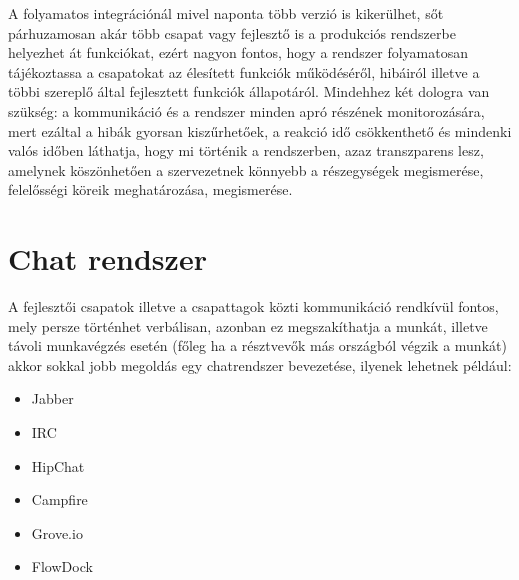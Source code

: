 A folyamatos integrációnál mivel naponta több verzió is kikerülhet, sőt párhuzamosan akár több csapat vagy fejlesztő is a produkciós rendszerbe helyezhet át funkciókat, ezért nagyon fontos, hogy a rendszer folyamatosan tájékoztassa a csapatokat az élesített funkciók működéséről, hibáiról illetve a többi szereplő által fejlesztett funkciók állapotáról. Mindehhez két dologra van szükség: a kommunikáció és a rendszer minden apró részének monitorozására, mert ezáltal a hibák gyorsan kiszűrhetőek, a reakció idő csökkenthető és mindenki valós időben láthatja, hogy mi történik a rendszerben, azaz transzparens lesz, amelynek köszönhetően a szervezetnek könnyebb a részegységek megismerése, felelősségi köreik meghatározása, megismerése.

\section{Chat rendszer}
A fejlesztői csapatok illetve a csapattagok közti kommunikáció rendkívül fontos, mely persze történhet verbálisan, azonban ez megszakíthatja a munkát, illetve távoli munkavégzés esetén (főleg ha a résztvevők más országból végzik a munkát) akkor sokkal jobb megoldás egy chatrendszer bevezetése, ilyenek lehetnek például:
\begin{itemize}
	\item Jabber
	\item IRC
	\item HipChat
	\item Campfire
	\item Grove.io
	\item FlowDock
\end{itemize}

